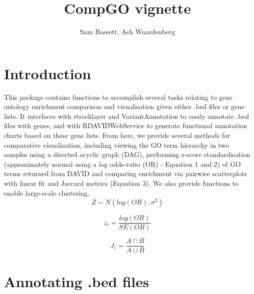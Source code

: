 \documentclass[11pt, oneside]{article}
\title{CompGO vignette}
\author{Sam Bassett, Ash Waardenberg}
\affil{Developmental and Stem Cell Biology Lab,\\Victor Chang Cardiac Research Institute,\\Darlinghurst, Sydney, Australia}
\date{}
\begin{document}
\maketitle
\section{Introduction}
This package contains functions to accomplish several tasks relating to gene ontology enrichment comparison and visualisation given either .bed files or gene lists. It interfaces with rtracklayer and VariantAnnotation to easily annotate .bed files with genes, and with RDAVIDWebService to generate functional annotation charts based on these gene lists. From here, we provide several methods for comparative visualisation, including viewing the GO term hierarchy in two samples using a directed acyclic graph (DAG), performing z-score standardisation (approximately normal using a log odds-ratio (OR) - Equation 1 and 2) of GO terms returned from DAVID and comparing enrichment via pairwise scatterplots with linear fit and Jaccard metrics (Equation 3). We also provide functions to enable large-scale clustering.\\

\begin{equation}
Z \sim N(log(OR), \sigma^{2})
\end{equation}

\begin{equation}
z_{i} = \frac{log(OR)}{SE(OR)}
\end{equation}

\begin{equation}
J_{c} = \frac{A \cap B }{A \cup B}
\end{equation}


\section{Annotating .bed files}
\end{document}
